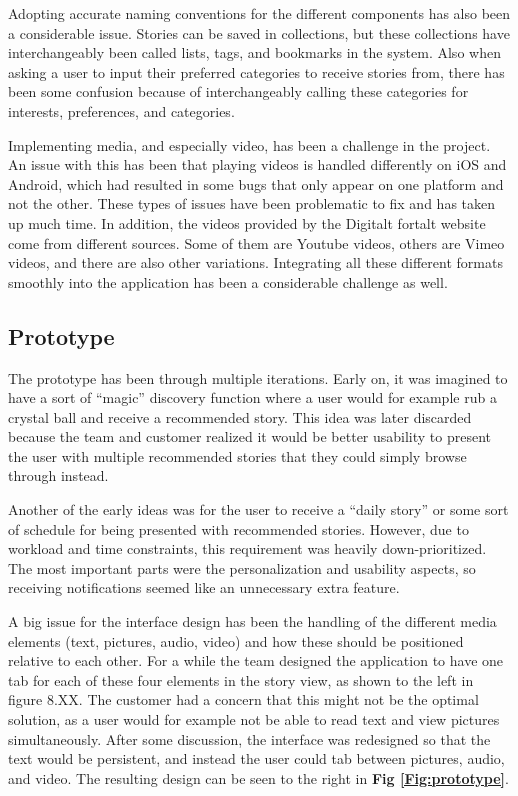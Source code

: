 Adopting accurate naming conventions for the different components has also been a considerable issue. Stories can be saved in collections, but these collections have interchangeably been called lists, tags, and bookmarks in the system. Also when asking a user to input their preferred categories to receive stories from, there has been some confusion because of interchangeably calling these categories for interests,  preferences, and categories.\newline

Implementing media, and especially video, has been a challenge in the project. An issue with this has been that playing videos is handled differently on iOS and Android, which had resulted in some bugs that only appear on one platform and not the other. These types of issues have been problematic to fix and has taken up much time. In addition, the videos provided by the Digitalt fortalt website come from different sources. Some of them are Youtube videos, others are Vimeo videos, and there are also other variations. Integrating all these different formats smoothly into the application has been a considerable challenge as well.

\subsection{Prototype}

The prototype has been through multiple iterations. Early on, it was imagined to have a sort of “magic” discovery function where a user would for example rub a crystal ball and receive a recommended story. This idea was later discarded because the team and customer realized
 it would be better usability to present the user with multiple recommended stories that they could simply browse through instead.\newline

Another of the early ideas was for the user to receive a “daily story” or some sort of schedule for being presented with recommended stories. However, due to workload and time constraints, this requirement was heavily down-prioritized. The most important parts were the personalization and usability aspects, so receiving notifications seemed like an unnecessary extra feature.\newline

A big issue for the interface design has been the handling of the different media elements (text, pictures, audio, video) and how these should be positioned relative to each other. For a while the team designed the application to have one tab for each of these four elements in the story view, as shown to the left in figure 8.XX. The customer had a concern that this might not be the optimal solution, as a user would for example not be able to read text and view pictures simultaneously. After some discussion, the interface was redesigned so that the text would be persistent, and instead the user could tab between pictures, audio, and video. The resulting design can be seen to the right in \textbf{Fig \ref{Fig:prototype}}. 

